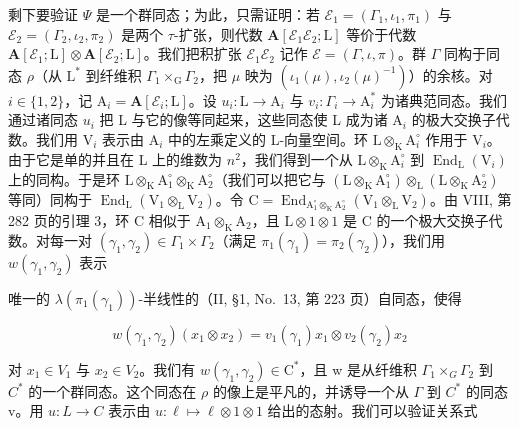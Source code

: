 剩下要验证 \(\Psi\) 是一个群同态；为此，只需证明：若 \(\mathcal{E}_1 = (\Gamma_1,\iota_1,\pi_1)\) 与 \(\mathcal{E}_2 = (\Gamma_2,\iota_2,\pi_2)\) 是两个 \(\tau\)-扩张，则代数 \(\mathbf{A}[\mathcal{E}_1\mathcal{E}_2;\mathrm{L}]\) 等价于代数 \(\mathbf{A}[\mathcal{E}_1;\mathrm{L}]\otimes \mathbf{A}[\mathcal{E}_2;\mathrm{L}]\)。我们把积扩张 \(\mathcal{E}_1\mathcal{E}_2\) 记作 \(\mathcal{E} = (\Gamma ,\iota ,\pi)\)。群 \(\Gamma\) 同构于同态 \(\rho\)（从 \(\mathrm{L}^*\) 到纤维积 \(\Gamma_1\times_{\mathrm{G}}\Gamma_2\)，把 \(\mu\) 映为 \((\iota_1(\mu),\iota_2(\mu)^{-1})\)）的余核。对 \(i\in \{1,2\}\)，记 \(\mathrm{A}_i = \mathbf{A}[\mathcal{E}_i;\mathrm{L}]\)。设 \(u_{i}:\mathrm{L}\to \mathrm{A}_{i}\) 与 \(v_{i}:\Gamma_{i}\rightarrow \mathrm{A}_{i}^{*}\) 为诸典范同态。我们通过诸同态 \(u_{i}\) 把 L 与它的像等同起来，这些同态使 L 成为诸 \(\mathrm{A}_i\) 的极大交换子代数。我们用 \(\mathrm{V}_i\) 表示由 \(\mathrm{A}_i\) 中的左乘定义的 L-向量空间。环 \(\mathrm{L}\otimes_{\mathrm{K}}\mathrm{A}_i^{\circ}\) 作用于 \(\mathrm{V}_i\)。由于它是单的并且在 L 上的维数为 \(n^2\)，我们得到一个从 \(\mathrm{L}\otimes_{\mathrm{K}}\mathrm{A}_i^{\circ}\) 到 \(\operatorname {End}_{\mathrm{L}}(\mathrm{V}_{i})\) 上的同构。于是环 \(\mathrm{L}\otimes_{\mathrm{K}}\mathrm{A}_1^{\circ}\otimes_{\mathrm{K}}\mathrm{A}_2^{\circ}\)（我们可以把它与 \((\mathrm{L}\otimes_{\mathrm{K}}\mathrm{A}_1^{\circ})\otimes_{\mathrm{L}}(\mathrm{L}\otimes_{\mathrm{K}}\mathrm{A}_2^{\circ})\) 等同）同构于 \(\operatorname {End}_{\mathrm{L}}(\mathrm{V}_{1}\otimes_{\mathrm{L}}\mathrm{V}_{2})\)。令 \(\mathrm{C} = \operatorname {End}_{\mathrm{A}_1^{\circ}\otimes_{\mathrm{K}}\mathrm{A}_2^{\circ}}(\mathrm{V}_1\otimes_\mathrm{L}\mathrm{V}_2)\)。由 VIII, 第 282 页的引理 3，环 C 相似于 \(\mathrm{A}_1\otimes_{\mathrm{K}}\mathrm{A}_2\)，且 \(\mathrm{L}\otimes 1\otimes 1\) 是 C 的一个极大交换子代数。对每一对 \((\gamma_{1},\gamma_{2})\in \Gamma_{1}\times \Gamma_{2}\)（满足 \(\pi_1(\gamma_1) = \pi_2(\gamma_2)\)），我们用 \(w(\gamma_1,\gamma_2)\) 表示

唯一的 \(\lambda (\pi_1(\gamma_1))\)-半线性的（II, §1, No.~13, 第 223 页）自同态，使得

\[
w (\gamma_ {1}, \gamma_ {2}) (x _ {1} \otimes x _ {2}) = v _ {1} (\gamma_ {1}) x _ {1} \otimes v _ {2} (\gamma_ {2}) x _ {2}
\]

对 \(x_{1} \in V_{1}\) 与 \(x_{2} \in V_{2}\)。我们有 \(w(\gamma_{1}, \gamma_{2}) \in \mathrm{C}^{*}\)，且 w 是从纤维积 \(\Gamma_{1} \times_{G} \Gamma_{2}\) 到 \(C^{*}\) 的一个群同态。这个同态在 \(\rho\) 的像上是平凡的，并诱导一个从 \(\Gamma\) 到 \(C^{*}\) 的同态 v。用 \(u : L \to C\) 表示由 \(u : \ell \mapsto \ell \otimes 1 \otimes 1\) 给出的态射。我们可以验证关系式

